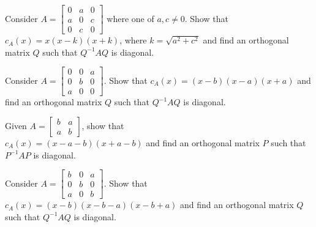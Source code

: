 \documentclass{ximera}
\begin{document}
\begin{problem}\label{prob:ortho11}
Consider $A = \begin{bmatrix}
0 & a & 0 \\
a & 0 & c \\
0 & c & 0
\end{bmatrix}$
 where one of $a, c \neq 0$. Show that $c_{A}(x) = x(x - k)(x + k)$, where $k = \sqrt{a^2 + c^2}$ and find an orthogonal matrix $Q$ such that $Q^{-1}AQ$ is diagonal.

\end{problem}
%
\begin{problem}\label{prob:ortho12}
Consider $A = \begin{bmatrix}
0 & 0 & a \\
0 & b & 0 \\
a & 0 & 0
\end{bmatrix}$. Show that $c_{A}(x) = (x - b)(x - a)(x + a)$ and find an orthogonal matrix $Q$ such that $Q^{-1}AQ$ is diagonal.
\end{problem}

\begin{problem}\label{prob:ortho13}
Given $A = \begin{bmatrix}
b & a \\
a & b
\end{bmatrix}$, show that \\ $c_{A}(x) = (x - a - b)(x + a - b)$ and find an orthogonal matrix $P$ such that $P^{-1}AP$ is diagonal.
\end{problem}

\begin{problem}\label{prob:ortho14}
Consider $A = \begin{bmatrix}
b & 0 & a \\
0 & b & 0 \\
a & 0 & b
\end{bmatrix}$. Show that $c_{A}(x) = (x - b)(x - b - a)(x - b + a)$ and find an orthogonal matrix $Q$ such that $Q^{-1}AQ$ is diagonal.
\end{problem}
\end{document}
